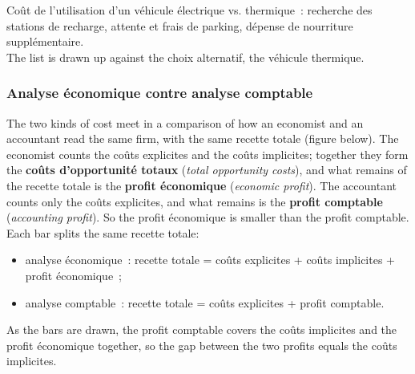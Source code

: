 \begin{example}
  Coût de l'utilisation d'un véhicule électrique vs. thermique~: recherche des
  stations de recharge, attente et frais de parking, dépense de nourriture
  supplémentaire.\\

  The list is drawn up against the choix alternatif, the véhicule thermique.
\end{example}

\subsubsection{Analyse économique contre analyse comptable}

The two kinds of cost meet in a comparison of how an economist and an accountant
read the same firm, with the same recette totale (figure below). The economist
counts the coûts explicites and the coûts implicites; together they form the
\textbf{coûts d'opportunité totaux} (\textit{total opportunity costs}), and what
remains of the recette totale is the \textbf{profit économique}
(\textit{economic profit}). The accountant counts only the coûts explicites, and
what remains is the \textbf{profit comptable} (\textit{accounting profit}). So the
profit économique is smaller than the profit comptable. Each bar splits the same recette totale:
\begin{itemize}
  \item analyse économique~: recette totale = coûts explicites + coûts implicites
    + profit économique~;
  \item analyse comptable~: recette totale = coûts explicites + profit comptable.
\end{itemize}
As the bars are drawn, the profit comptable covers the coûts implicites and the
profit économique together, so the gap between the two profits equals the coûts
implicites.

